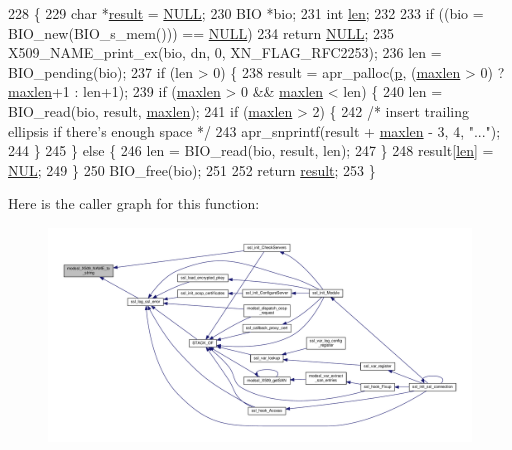 \begin{DoxyCode}
228 \{
229     \textcolor{keywordtype}{char} *\hyperlink{group__APACHE__CORE__MPM_ga9f5959dd76d5c83e775dcf44de684686}{result} = \hyperlink{pcre_8txt_ad7f989d16aa8ca809a36bc392c07fba1}{NULL};
230     BIO *bio;
231     \textcolor{keywordtype}{int} \hyperlink{group__APACHE__CORE__LOG_gab5a43233d60ef05c5b5bf5cba3d74468}{len};
232 
233     \textcolor{keywordflow}{if} ((bio = BIO\_new(BIO\_s\_mem())) == \hyperlink{pcre_8txt_ad7f989d16aa8ca809a36bc392c07fba1}{NULL})
234         \textcolor{keywordflow}{return} \hyperlink{pcre_8txt_ad7f989d16aa8ca809a36bc392c07fba1}{NULL};
235     X509\_NAME\_print\_ex(bio, dn, 0, XN\_FLAG\_RFC2253);
236     len = BIO\_pending(bio);
237     \textcolor{keywordflow}{if} (len > 0) \{
238         result = apr\_palloc(\hyperlink{group__APACHE__CORE__MPM_ga5cd91701e5c167f2b1a38e70ab57817e}{p}, (\hyperlink{group__APACHE__CORE__DAEMON_ga396b50964961e17784202ccbefcbf25d}{maxlen} > 0) ? \hyperlink{group__APACHE__CORE__DAEMON_ga396b50964961e17784202ccbefcbf25d}{maxlen}+1 : len+1);
239         \textcolor{keywordflow}{if} (\hyperlink{group__APACHE__CORE__DAEMON_ga396b50964961e17784202ccbefcbf25d}{maxlen} > 0 && \hyperlink{group__APACHE__CORE__DAEMON_ga396b50964961e17784202ccbefcbf25d}{maxlen} < len) \{
240             len = BIO\_read(bio, result, \hyperlink{group__APACHE__CORE__DAEMON_ga396b50964961e17784202ccbefcbf25d}{maxlen});
241             \textcolor{keywordflow}{if} (\hyperlink{group__APACHE__CORE__DAEMON_ga396b50964961e17784202ccbefcbf25d}{maxlen} > 2) \{
242                 \textcolor{comment}{/* insert trailing ellipsis if there's enough space */}
243                 apr\_snprintf(result + \hyperlink{group__APACHE__CORE__DAEMON_ga396b50964961e17784202ccbefcbf25d}{maxlen} - 3, 4, \textcolor{stringliteral}{"..."});
244             \}
245         \} \textcolor{keywordflow}{else} \{
246             len = BIO\_read(bio, result, len);
247         \}
248         result[\hyperlink{group__APACHE__CORE__LOG_gab5a43233d60ef05c5b5bf5cba3d74468}{len}] = \hyperlink{group__MOD__SSL__PRIVATE_gaf19d48b9f61047a668649a2f9dc317ff}{NUL};
249     \}
250     BIO\_free(bio);
251 
252     \textcolor{keywordflow}{return} \hyperlink{group__APACHE__CORE__MPM_ga9f5959dd76d5c83e775dcf44de684686}{result};
253 \}
\end{DoxyCode}


Here is the caller graph for this function\+:
\nopagebreak
\begin{figure}[H]
\begin{center}
\leavevmode
\includegraphics[width=350pt]{group__MOD__SSL__UTIL_ga51008e236441926c31150e12283c87aa_icgraph}
\end{center}
\end{figure}


